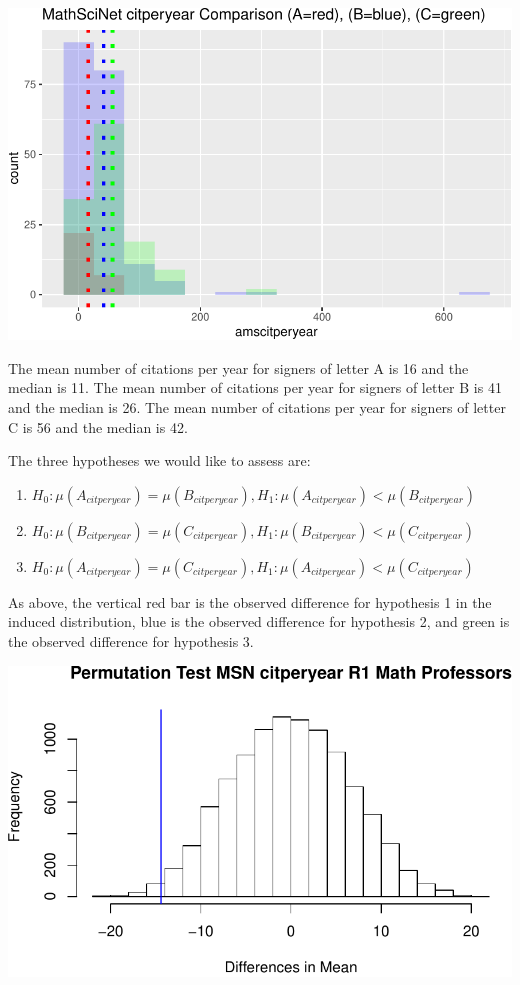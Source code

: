 \documentclass[]{article}
\begin{document}
\includegraphics{Response_files/figure-latex/unnamed-chunk-14-1.pdf}

The mean number of citations per year for signers of letter A is 16 and
the median is 11. The mean number of citations per year for signers of
letter B is 41 and the median is 26. The mean number of citations per
year for signers of letter C is 56 and the median is 42.

The three hypotheses we would like to assess are:

\begin{enumerate}
\def\labelenumi{\arabic{enumi}.}
\item
  \(H_0: \mu(A_{citperyear}) = \mu(B_{citperyear}), H_1: \mu(A_{citperyear}) < \mu(B_{citperyear})\)
\item
  \(H_0: \mu(B_{citperyear}) = \mu(C_{citperyear}), H_1: \mu(B_{citperyear}) < \mu(C_{citperyear})\)
\item
  \(H_0: \mu(A_{citperyear}) = \mu(C_{citperyear}), H_1: \mu(A_{citperyear}) < \mu(C_{citperyear})\)
\end{enumerate}

As above, the vertical red bar is the observed difference for hypothesis
1 in the induced distribution, blue is the observed difference for
hypothesis 2, and green is the observed difference for hypothesis 3.

\includegraphics{Response_files/figure-latex/unnamed-chunk-16-1.pdf}
\end{document}
